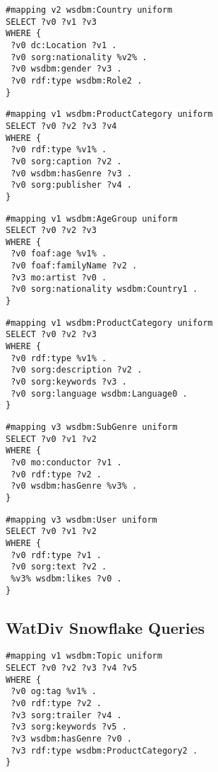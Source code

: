 \begin{lstlisting}[caption={S2},label=query:S2]
#mapping v2 wsdbm:Country uniform
SELECT ?v0 ?v1 ?v3
WHERE {
 ?v0 dc:Location ?v1 .
 ?v0 sorg:nationality %v2% .
 ?v0 wsdbm:gender ?v3 .
 ?v0 rdf:type wsdbm:Role2 .
}
\end{lstlisting}

\begin{lstlisting}[caption={S3},label=query:S3]
#mapping v1 wsdbm:ProductCategory uniform
SELECT ?v0 ?v2 ?v3 ?v4
WHERE {
 ?v0 rdf:type %v1% .
 ?v0 sorg:caption ?v2 .
 ?v0 wsdbm:hasGenre ?v3 .
 ?v0 sorg:publisher ?v4 .
}
\end{lstlisting}

\begin{lstlisting}[caption={S4},label=query:S4]
#mapping v1 wsdbm:AgeGroup uniform
SELECT ?v0 ?v2 ?v3
WHERE {
 ?v0 foaf:age %v1% .
 ?v0 foaf:familyName ?v2 .
 ?v3 mo:artist ?v0 .
 ?v0 sorg:nationality wsdbm:Country1 .
}
\end{lstlisting}

\begin{lstlisting}[caption={S5},label=query:S5]
#mapping v1 wsdbm:ProductCategory uniform
SELECT ?v0 ?v2 ?v3
WHERE {
 ?v0 rdf:type %v1% .
 ?v0 sorg:description ?v2 .
 ?v0 sorg:keywords ?v3 .
 ?v0 sorg:language wsdbm:Language0 .
}
\end{lstlisting}

\begin{lstlisting}[caption={S6},label=query:S6]
#mapping v3 wsdbm:SubGenre uniform
SELECT ?v0 ?v1 ?v2
WHERE {
 ?v0 mo:conductor ?v1 .
 ?v0 rdf:type ?v2 .
 ?v0 wsdbm:hasGenre %v3% .
}
\end{lstlisting}

\begin{lstlisting}[caption={S7},label=query:S7]
#mapping v3 wsdbm:User uniform
SELECT ?v0 ?v1 ?v2
WHERE {
 ?v0 rdf:type ?v1 .
 ?v0 sorg:text ?v2 .
 %v3% wsdbm:likes ?v0 .
}
\end{lstlisting}

\subsection{WatDiv Snowflake Queries}
\label{queries:watdivbasic:flake}

\begin{lstlisting}[caption={F1},label=query:F1]
#mapping v1 wsdbm:Topic uniform
SELECT ?v0 ?v2 ?v3 ?v4 ?v5
WHERE {
 ?v0 og:tag %v1% .
 ?v0 rdf:type ?v2 .
 ?v3 sorg:trailer ?v4 .
 ?v3 sorg:keywords ?v5 .
 ?v3 wsdbm:hasGenre ?v0 .
 ?v3 rdf:type wsdbm:ProductCategory2 .
}
\end{lstlisting}

